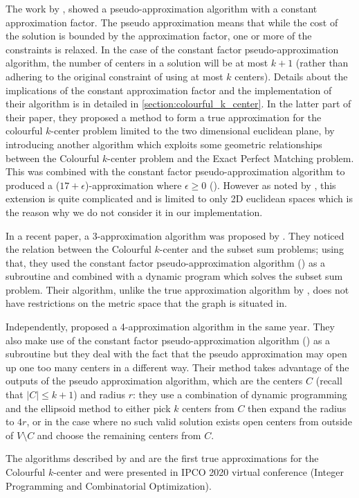 The work by \textcite{bandyapadhyay_constant_2019}, showed a pseudo-approximation algorithm with a constant approximation factor. The pseudo approximation means that while the cost of the solution is bounded by the approximation factor, one or more of the constraints is relaxed. In the case of the constant factor pseudo-approximation algorithm, the number of centers in a solution will be at most $k+1$ (rather than adhering to the original constraint of using at most $k$ centers). Details about the implications of the constant approximation factor and the implementation of their algorithm is in detailed in \cref{section:colourful_k_center}. In the latter part of their paper, they proposed a method to form a true approximation for the colourful $k$-center problem limited to the two dimensional euclidean plane, by introducing another algorithm which exploits some geometric relationships between the Colourful $k$-center problem and the Exact Perfect Matching problem. This was combined with the constant factor pseudo-approximation algorithm to produced a ($17+\epsilon$)-approximation where $\epsilon\geq 0$ (\cite{bandyapadhyay_constant_2019}). However as noted by \textcite{anegg_technique_2020}, this extension is quite complicated and is limited to only 2D euclidean spaces which is the reason why we do not consider it in our implementation.

In a recent paper, a 3-approximation algorithm was proposed by \textcite{jia_fair_2020}. They noticed the relation between the Colourful $k$-center and the subset sum problems; using that, they used the constant factor pseudo-approximation algorithm (\cite{bandyapadhyay_constant_2019}) as a subroutine and combined with a dynamic program which solves the subset sum problem. Their algorithm, unlike the true approximation algorithm by \textcite{bandyapadhyay_constant_2019}, does not have restrictions on the metric space that the graph is situated in.

Independently, \textcite{anegg_technique_2020} proposed a 4-approximation algorithm in the same year. They also make use of the constant factor pseudo-approximation algorithm (\cite{bandyapadhyay_constant_2019}) as a subroutine but they deal with the fact that the pseudo approximation may open up one too many centers in a different way. Their method takes advantage of the outputs of the pseudo approximation algorithm, which are the centers $C$ (recall that $|C|\leq k+1$) and radius $r$: they use a combination of dynamic programming and the ellipsoid method to either pick $k$ centers from $C$ then expand the radius to $4r$, or in the case where no such valid solution exists open centers from outside of $V\setminus C$ and choose the remaining centers from $C$.

The algorithms described by \textcite{jia_fair_2020} and \textcite{anegg_technique_2020} are the first true approximations for the Colourful $k$-center and were presented in IPCO 2020 virtual conference (Integer Programming and Combinatorial Optimization). 